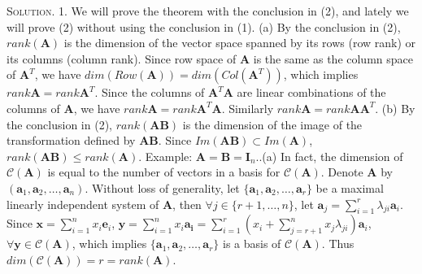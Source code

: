 \documentclass[12pt, a4paper, oneside]{ctexart}
\newenvironment{solution}{\par\noindent\textsc{Solution. }}{\\\par}
\begin{document}
\begin{solution}
	1. We will prove the theorem with the conclusion in (2), and lately we will prove (2) without using the conclusion in (1). \newline
	(a) By the conclusion in (2), $rank(\mathbf{A})$ is the dimension of the vector space spanned by its rows (row rank) or its columns (column rank). Since row space of $\mathbf{A}$ is the same as the column space of $\mathbf{A}^{T}$, we have $dim(Row(\mathbf{A})) = dim(Col(\mathbf{\mathbf{A}}^{T}))$, which implies $rank{\mathbf{A}} = rank{\mathbf{A}^{T}}$. Since the columns of $\mathbf{A}^{T} \mathbf{A}$ are linear combinations of the columns of $\mathbf{A}$, we have $rank{\mathbf{A}} = rank{\mathbf{A}^{T}\mathbf{A}}$. Similarly $rank{\mathbf{A}} = rank{\mathbf{A}\mathbf{A}^{T}}$.\newline
	(b) By the conclusion in (2), $rank(\mathbf{AB})$ is the dimension of the image of the transformation defined by $\mathbf{AB}$. Since $Im(\mathbf{AB}) \subset Im(\mathbf{A})$, $rank(\mathbf{AB}) \leq rank(\mathbf{A})$. Example: $\mathbf{A} = \mathbf{B} = \mathbf{I}_n$..(a) In fact, the dimension of $\mathcal{C}(\mathbf{A})$ is equal to the number of vectors in a basis for $\mathcal{C}(\mathbf{A})$. Denote $\mathbf{A}$ by $(\mathbf{a}_{1}, \mathbf{a}_{2}, \dots, \mathbf{a}_{n})$. Without loss of generality, let $\{\mathbf{a}_{1}, \mathbf{a}_{2}, \dots, \mathbf{a}_{r}\}$ be a maximal linearly independent system of $\mathbf{A}$, then $\forall j \in \{r+1, \dots, n\}$, let $\mathbf{a}_{j} = \sum_{i = 1}^{r}\lambda_{ji}\mathbf{a}_{i}$. Since $\mathbf{x} = \sum_{i = 1}^{n}x_{i}\mathbf{e}_{i}$, $\mathbf{y} = \sum_{i = 1}^{n} x_{i}\mathbf{a_{i}} = \sum_{i = 1}^{r} (x_{i} + \sum_{j = r + 1}^{n}x_{j}\lambda_{ji})\mathbf{a}_{i}$, $\forall \mathbf{y} \in \mathcal{C}(\mathbf{A})$, which implies $\{\mathbf{a}_{1}, \mathbf{a}_{2}, \dots, \mathbf{a}_{r}\}$ is a basis of $\mathcal{C}(\mathbf{A})$. Thus $dim(\mathcal{C}(\mathbf{A})) = r = rank(\mathbf{A})$. \newline

\end{solution}
\end{document}
